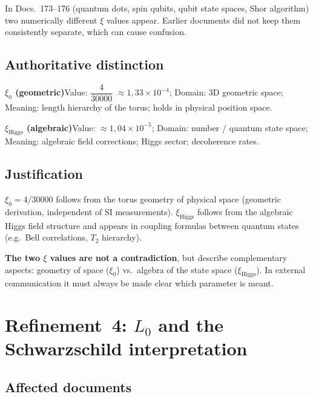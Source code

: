 In Docs.~173--176 (quantum dots, spin qubits, qubit state spaces, Shor
algorithm) two numerically different $\xi$ values appear. Earlier documents did
not keep them consistently separate, which can cause confusion.

\subsection*{Authoritative distinction}

\smallskip\noindent \textbf{$\xi_0$ (geometric)}\quad Value: $\dfrac{4}{30000}$ $\approx 1{,}33 \times 10^{-4}$; Domain: 3D geometric space; Meaning: length hierarchy of the torus; holds in physical position space.

\smallskip\noindent \textbf{$\xi_{\text{Higgs}}$ (algebraic)}\quad Value: $\approx 1{,}04 \times 10^{-5}$; Domain: number / quantum state space; Meaning: algebraic field corrections; Higgs sector; decoherence rates.

\medskip


\subsection*{Justification}

$\xi_0 = 4/30000$ follows from the torus geometry of physical space (geometric
derivation, independent of SI measurements). $\xi_{\text{Higgs}}$ follows from
the algebraic Higgs field structure and appears in coupling formulas between
quantum states (e.g.\ Bell correlations, $T_2$ hierarchy).

\textbf{The two $\xi$ values are not a contradiction}, but describe
complementary aspects: geometry of space ($\xi_0$) vs.\ algebra of the state
space ($\xi_{\text{Higgs}}$). In external communication it must always be made
clear which parameter is meant.

\section{\texorpdfstring{Refinement~4: $L_0$ and the Schwarzschild interpretation}{Refinement 4: L0 and the Schwarzschild interpretation}}

\subsection*{Affected documents}

